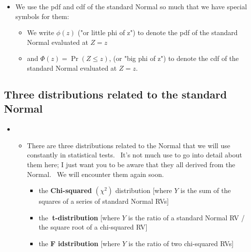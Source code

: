 \documentclass[11pt]{article}
\begin{document}
\begin{itemize}
\item We use the pdf and cdf of the standard Normal so much that we have
special symbols for them:

\begin{itemize}
\item We write $\phi \left( z\right) $ ("or little phi of z") to denote the
pdf of the standard Normal evaluated at $Z=z$

\item and $\Phi \left( z\right) =\Pr \left( Z\leq z\right) $, (or "big phi
of z") to denote the cdf of the standard Normal evaluated at $Z=z.$
\end{itemize}
\end{itemize}

\subsection{Three distributions related to the standard Normal}

\begin{itemize}
\item 
\begin{itemize}
\item There are three distributions related to the Normal that we will use
constantly in statistical tests. \ It's not much use to go into detail about
them here; I just want you to be aware that they all derived from the
Normal. \ We will encounter them again soon.

\begin{itemize}
\item the \textbf{Chi-squared} $\left( \chi ^{2}\right) $ distribution
[where $Y$ is the sum of the squares of a series of standard Normal RVs]

\item the\textbf{\ t-distribution} [where $Y$ is the ratio of a standard
Normal RV / the square root of a chi-squared RV]

\item the \textbf{F idstribution} [where $Y$ is the ratio of two chi-squared
RVs]
\end{itemize}
\end{itemize}
\end{itemize}
\end{document}
